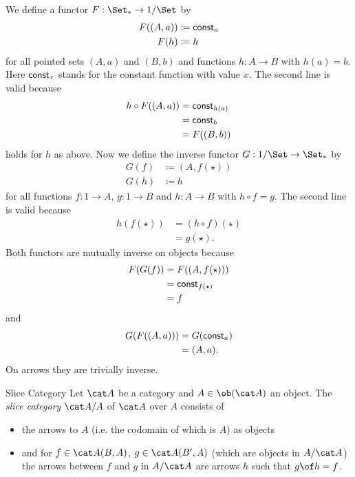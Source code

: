 \begin{answer}
  We define a functor $F : \Set_* \to 1/\Set$ by
  \begin{align*}
    F((A, a)) &\coloneqq \mathsf{const}_{a} \\
    F(h) &\coloneqq h
  \end{align*}
  for all pointed sets $(A, a)$ and $(B, b)$ and functions $h : A \to B$ with $h(a) = b$.
  Here $\mathsf{const}_{x}$ stands for the constant function with value $x$.
  The second line is valid because
  \[ \begin{split}
    h \circ F((A, a))
    &= \mathsf{const}_{h(a)} \\
    &= \mathsf{const}_{b} \\
    &= F((B, b))
  \end{split} \]
  holds for $h$ as above.
  Now we define the inverse functor $G : 1/\Set \to \Set_*$ by
  \begin{align*}
    G(f) &\coloneqq (A, f(\star)) \\
    G(h) &\coloneqq h
  \end{align*}
  for all functions $f : 1 \to A$, $g : 1 \to B$ and $h : A \to B$ with $h \circ f = g$.
  The second line is valid because
  \[ \begin{split}
    h(f(\star))
    &= (h \circ f)(\star) \\
    &= g(\star).
  \end{split} \]
  Both functors are mutually inverse on objects because
  \[ \begin{split}
    F(G(f))
    &= F((A, f(\star))) \\
    &= \mathsf{const}_{f(\star)} \\
    &= f
  \end{split} \]
  and
  \[ \begin{split}
    G(F((A, a)))
    &= G(\mathsf{const}_{a}) \\
    &= (A, a).
  \end{split} \]
  On arrows they are trivially inverse.
\end{answer}

\begin{definition}{Slice Category}
  Let $\A$ be a category and $A\in\ob(\A)$ an object. The \emph{slice category} $\A/A$ of $\A$ over $A$ consists of
  \begin{itemize}
  \item the arrows to $A$ (i.e. the codomain of which is $A$) as objects
  \item and for $f\in \A(B,A)$, $g\in\A(B',A)$ (which are objects in $A/\A$) the arrows between $f$ and $g$ in $A/\A$ are arrows $h$ such that $g\of h=f$.
  \end{itemize}
\end{definition}

